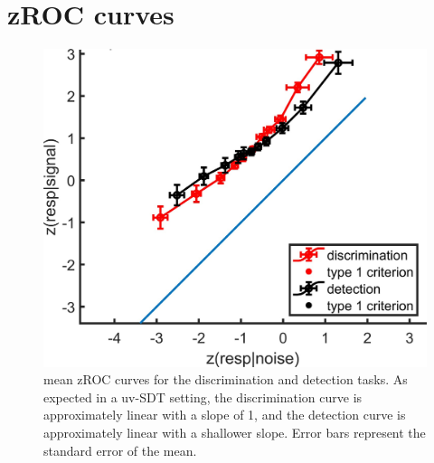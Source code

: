 \documentclass[12pt,twoside]{reedthesis}
\begin{document}
\hypertarget{app3-zROC}{%
\section{zROC curves}\label{app3-zROC}}
\begin{figure}[H]
\includegraphics[width=\linewidth]{figure/fMRI/zROC} \caption[zROC curves, imaging experiment]{mean zROC curves for the discrimination and detection tasks. As expected in a uv-SDT setting, the discrimination curve is approximately linear with a slope of 1, and the detection curve is approximately linear with a shallower slope. Error bars represent the standard error of the mean.}\label{fig:zROC}
\end{figure}
\newpage
\end{document}
